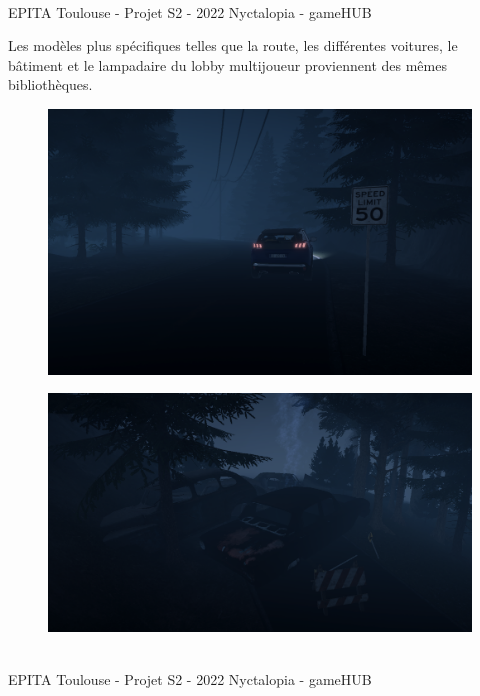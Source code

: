 \vfill
\noindent\makebox[\linewidth]{\rule{.8\paperwidth}{.6pt}}\\[0.2cm]
EPITA Toulouse - Projet S2 - 2022 \hfill Nyctalopia - gameHUB
\noindent\makebox[\linewidth]{\rule{.8\paperwidth}{.6pt}}

\newpage



Les modèles plus spécifiques telles que la route, les différentes voitures, le bâtiment et le lampadaire du lobby multijoueur proviennent des mêmes bibliothèques.
\newline

\begin{figure}[H]
\centering
\begin{minipage}{.5\textwidth}
  \centering
  \includegraphics[width=.6\linewidth]{img/assets/car.png}
  \label{fig:car}
\end{minipage}%
\begin{minipage}{.5\textwidth}
  \centering
  \includegraphics[width=.6\linewidth]{img/assets/crash.png}
  \label{fig:crash}
\end{minipage}
\end{figure}

\vfill
\noindent\makebox[\linewidth]{\rule{.8\paperwidth}{.6pt}}\\[0.2cm]
EPITA Toulouse - Projet S2 - 2022 \hfill Nyctalopia - gameHUB
\noindent\makebox[\linewidth]{\rule{.8\paperwidth}{.6pt}}

\newpage

